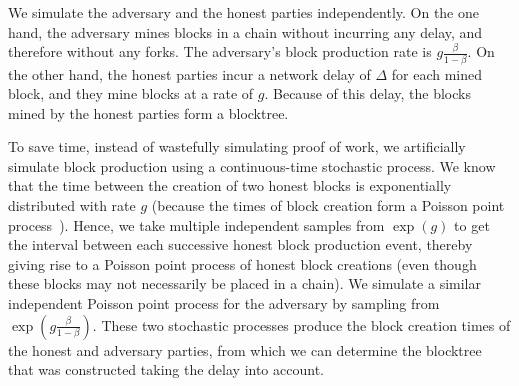 We simulate the adversary and the honest parties independently. On the one hand, the adversary mines blocks
in a chain without incurring any delay, and therefore without any forks. The adversary's block production rate is
$g\frac{\beta}{1 - \beta}$. On the other hand, the honest parties incur a network delay of $\Delta$ for each mined block,
and they mine blocks at a rate of $g$. Because of this delay, the blocks mined by the honest parties form a blocktree.

To save time, instead of wastefully simulating proof of work, we artificially simulate block production using a
continuous-time stochastic process.
We know that the time between the creation of two honest blocks is exponentially distributed
with rate $g$ (because the times of block creation form a Poisson point process~\cite{bitcoin-made-simple}).
Hence, we take multiple independent samples from $\exp(g)$ to get the interval between each successive honest block production event,
thereby giving rise to a Poisson point process of honest block creations (even though these blocks may not necessarily be placed in a chain).
We simulate a similar independent Poisson point process for the adversary
by sampling from $\exp(g\frac{\beta}{1 - \beta})$. These two stochastic processes produce the block creation times of the honest and
adversary parties, from which we can determine the blocktree that was constructed taking the delay into account.


